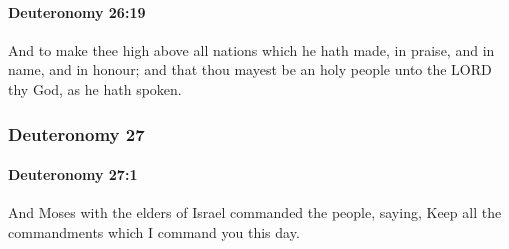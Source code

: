 		\paragraph{Deuteronomy 26:19} %
			\label{DEUTERONOMY-26-19}

			And to make thee high above all nations which he hath made, in praise, and in name, and in honour; and that thou mayest be an holy people unto the LORD thy God, as he hath spoken.

	\subsubsection{Deuteronomy 27} %
		\label{DEUTERONOMY-27}

		\paragraph{Deuteronomy 27:1} %
			\label{DEUTERONOMY-27-1}

			And Moses with the elders of Israel commanded the people, saying, Keep all the commandments which I command you this day.

